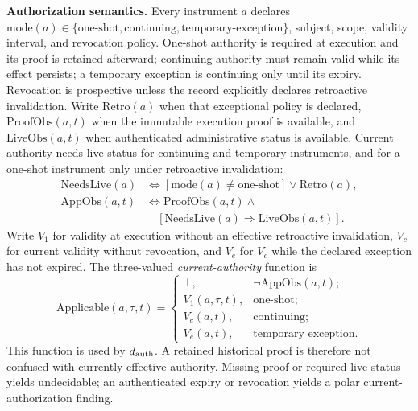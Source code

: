 \textbf{Authorization semantics.} Every instrument $a$ declares
$\mathrm{mode}(a)\in\{\text{one-shot},\text{continuing},
\text{temporary-exception}\}$, subject, scope, validity interval, and
revocation policy. One-shot authority is required at execution and its proof
is retained afterward; continuing authority must remain valid while its
effect persists; a temporary exception is continuing only until its expiry.
Revocation is prospective unless the record explicitly declares retroactive
invalidation. Write $\mathrm{Retro}(a)$ when that exceptional policy is
declared, $\mathrm{ProofObs}(a,t)$ when the immutable execution proof is
available, and $\mathrm{LiveObs}(a,t)$ when authenticated administrative
status is available. Current authority needs live status for continuing and
temporary instruments, and for a one-shot instrument only under retroactive
invalidation:
\[
\begin{aligned}
\mathrm{NeedsLive}(a)&\Longleftrightarrow
 [\mathrm{mode}(a)\neq\text{one-shot}]\lor\mathrm{Retro}(a),\\
\mathrm{AppObs}(a,t)&\Longleftrightarrow \mathrm{ProofObs}(a,t)\land\\
&\quad [\mathrm{NeedsLive}(a)\Rightarrow\mathrm{LiveObs}(a,t)].
\end{aligned}
\]
Write $V_1$ for validity at execution without an effective retroactive
invalidation, $V_c$ for current validity without revocation, and $V_e$ for
$V_c$ while the declared exception has not expired. The three-valued
\emph{current-authority} function is
\[
\mathrm{Applicable}(a,\tau,t)=
\begin{cases}
\bot,&\neg\mathrm{AppObs}(a,t);\\
V_1(a,\tau,t),&\text{one-shot};\\
V_c(a,t),&\text{continuing};\\
V_e(a,t),&\text{temporary exception}.
\end{cases}
\]
This function is used by $d_{\mathrm{auth}}$. A retained historical proof is therefore not
confused with currently effective authority. Missing proof or required live
status yields undecidable; an authenticated expiry or revocation yields a
polar current-authorization finding.

